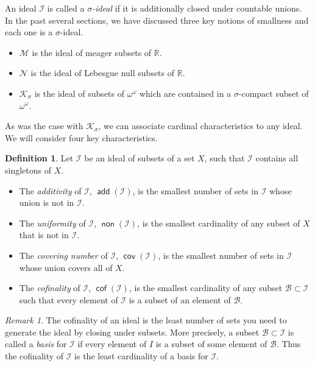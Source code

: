 \documentclass[11pt,oneside]{amsbook}
\newcommand{\R}{\mathbb R}
\newcommand{\Null}{\mathcal N}
\newcommand{\Meager}{\mathcal M}
\newcommand{\Ksigma}{\mathcal K_\sigma}
\DeclareMathOperator{\add}{\mathsf{add}}
\DeclareMathOperator{\non}{\mathsf{non}}
\DeclareMathOperator{\cov}{\mathsf{cov}}
\DeclareMathOperator{\cof}{\mathsf{cof}}
\theoremstyle{definition}
\theoremstyle{plain}
\theoremstyle{definition}
\newtheorem{definition}[theorem]{Definition}
\theoremstyle{remark}
\newtheorem{remark}[theorem]{Remark}
\numberwithin{equation}{section}
\numberwithin{figure}{section}
\begin{document}
An ideal $\mathcal I$ is called a \emph{$\sigma$-ideal} if it is additionally closed under countable unions. In the past several sections, we have discussed three key notions of smallness and each one is a $\sigma$-ideal.
\begin{itemize}
  \item $\Meager$ is the ideal of meager subsets of $\R$.
  \item $\Null$ is the ideal of Lebesgue null subsets of $\R$.
  \item $\Ksigma$ is the ideal of subsets of $\omega^\omega$ which are contained in a $\sigma$-compact subset of $\omega^\omega$.
\end{itemize}

As was the case with $\Ksigma$, we can associate cardinal characteristics to any ideal. We will consider four key characteristics.

\begin{definition} Let $\mathcal I$ be an ideal of subsets of a set $X$, such that $\mathcal I$ contains all singletons of $X$.
  \begin{itemize}
  \item The \emph{additivity} of $\mathcal{I}$, $\add(\mathcal{I})$, is the smallest number of sets in $\mathcal{I}$ whose union is not in $\mathcal{I}$.
  \item The \emph{uniformity} of $\mathcal{I}$, $\non(\mathcal{I})$, is the smallest cardinality of any subset of $X$ that is not in $\mathcal{I}$.
  \item The \emph{covering number} of $\mathcal{I}$, $\cov(\mathcal{I})$, is the smallest number of sets in $\mathcal{I}$ whose union covers all of $X$.
  \item The \emph{cofinality} of $\mathcal{I}$, $\cof(\mathcal{I})$, is the smallest cardinality of any subset $\mathcal{B}\subset\mathcal{I}$ such that every element of $\mathcal{I}$ is a subset of an element of $\mathcal{B}$.
  \end{itemize}
\end{definition}

\begin{remark}
The cofinality of an ideal is the least number of sets you need to generate the ideal by closing under subsets. More precisely, a subset $\mathcal B\subset\mathcal I$ is called a \emph{basis} for $\mathcal I$ if every element of $I$ is a subset of some element of $\mathcal B$. Thus the cofinality of $\mathcal I$ is the least cardinality of a basis for $\mathcal I$.
\end{remark}
\end{document}

